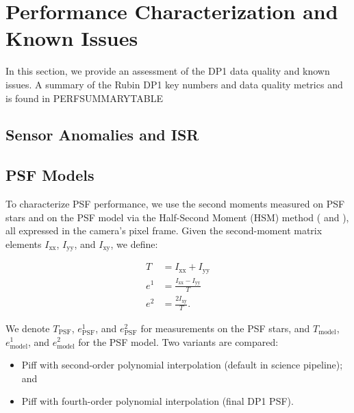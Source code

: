 \section{Performance Characterization and Known Issues
\label{sec:performance}}
%
In this section, we provide an assessment of the DP1
data quality and known issues. 
A summary of the Rubin DP1 key numbers and data quality metrics and is found in PERFSUMMARYTABLE
%

\subsection{Sensor Anomalies and ISR}
\label{ssec:sensor_anomalies}


\subsection{PSF Models
\label{ssec:psf_models}}

To characterize PSF performance, we use the second moments measured on PSF stars 
and on the PSF model via the Half-Second Moment (HSM) method  (\citealt{2003MNRAS.343..459H} and 
\citealt{2005MNRAS.361.1287M}), all expressed in the camera’s
pixel frame. Given the second-moment matrix elements $I_{\text{xx}}$,
$I_{\text{yy}}$, and $I_{\text{xy}}$, we define:

\begin{align*}
T &= I_{\text{xx}} + I_{\text{yy}} \\
e^1 &= \frac{I_{\text{xx}} - I_{\text{yy}}}{T} \\
e^2 &= \frac{2 I_{\text{xy}}}{T}.
\end{align*}

\noindent We denote $T_{\text{PSF}}$, $e^1_{\text{PSF}}$, and $e^2_{\text{PSF}}$ for 
measurements on the PSF stars, and $T_{\text{model}}$, $e^1_{\text{model}}$, 
and $e^2_{\text{model}}$ for the PSF model. Two variants are compared:

\begin{itemize}
\item Piff with second-order polynomial interpolation (default in science pipeline); and
\item Piff with fourth-order polynomial interpolation (final DP1 PSF).
\end{itemize}

